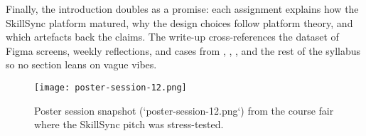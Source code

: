 \documentclass[12pt,a4paper]{article}
\begin{document}
Finally, the introduction doubles as a promise: each assignment explains how the SkillSync platform matured, why the design choices follow platform theory, and which artefacts back the claims. The write-up cross-references the dataset of Figma screens, weekly reflections, and cases from \citet{Choudary2016}, \citet{Srnicek2017}, \citet{Reillier2017}, and the rest of the syllabus so no section leans on vague vibes.

\begin{figure}[h]
  \centering
  \texttt{[image: poster-session-12.png]}
  \caption{Poster session snapshot (`poster-session-12.png`) from the course fair where the SkillSync pitch was stress-tested.}
  \label{fig:intro-showcase}
\end{figure}












\newpage


\end{document}
